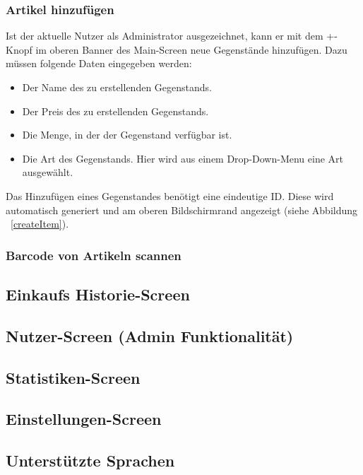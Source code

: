 \subsubsection{Artikel hinzufügen} \label{subsubsec:shop-add-items}

Ist der aktuelle Nutzer als Administrator ausgezeichnet, kann er mit dem +-Knopf im oberen Banner des Main-Screen neue Gegenstände hinzufügen.
Dazu müssen folgende Daten eingegeben werden:

\begin{itemize}
	\item Der Name des zu erstellenden Gegenstands.

	\item Der Preis des zu erstellenden Gegenstands.

	\item Die Menge, in der der Gegenstand verfügbar ist.

	\item Die Art des Gegenstands.
	Hier wird aus einem Drop-Down-Menu eine Art ausgewählt.
\end{itemize}

Das Hinzufügen eines Gegenstandes benötigt eine eindeutige ID. Diese wird automatisch generiert und am oberen Bildschirmrand angezeigt (siehe Abbildung ~\ref{createItem}).


\subsubsection{Barcode von Artikeln scannen} \label{subsubsec:shop-admin-scan-item}


\subsection{Einkaufs Historie-Screen} \label{subsec:purchases-screen}


\subsection{Nutzer-Screen (Admin Funktionalität)} \label{subsec:user-screen}

\subsection{Statistiken-Screen} \label{subsec:statistics-screen}

\subsection{Einstellungen-Screen} \label{subsec:settings-screen}

\subsection{Unterstützte Sprachen} \label{subsec:languages}
